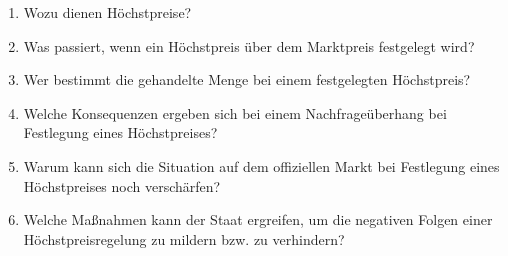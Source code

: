 \begin{enumerate}[label=(\alph*)]
    \item Wozu dienen Höchstpreise?
    \item Was passiert, wenn ein Höchstpreis über dem Marktpreis festgelegt wird?
    \item Wer bestimmt die gehandelte Menge bei einem festgelegten Höchstpreis?
    \item Welche Konsequenzen ergeben sich bei einem Nachfrageüberhang bei Festlegung eines Höchstpreises?
    \item Warum kann sich die Situation auf dem offiziellen Markt bei Festlegung eines Höchstpreises noch verschärfen?
    \item Welche Maßnahmen kann der Staat ergreifen, um die negativen Folgen einer Höchstpreisregelung zu mildern bzw. zu verhindern?
\end{enumerate}

